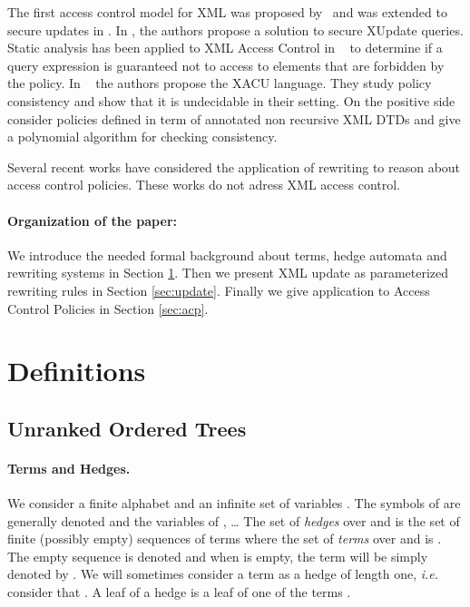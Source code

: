 \documentclass[a4paper]{article}
\newcommand{\remarque}[1]{}
\theoremstyle{plain}
\begin{document}
The first access control model for XML was proposed by~\cite{DamianiVPS00} 
and was extended to secure updates in \cite{Lim03}. In \cite{Gabillon05}, the authors propose a solution to secure XUpdate queries.
Static analysis has been applied to XML Access Control in ~\cite{Murata06} to determine if a query expression 
is guaranteed not to access to elements that are forbidden by the policy. 
In ~\cite{FundulakiManeth07} the authors propose the XACU language. 
They study  policy consistency and show that it is undecidable in their setting. 
On the positive side~\cite{Bravo08} consider policies defined in term of annotated non recursive XML DTDs 
and give a polynomial algorithm for checking consistency. 
\remarque{c'est sur?}

Several recent works have considered the 
application of rewriting to reason about  
access control policies. These works do not adress  XML access control. 


\paragraph{Organization of the paper:} We introduce the needed 
formal background about terms, hedge automata and rewriting systems 
in Section \ref{sec:def}. Then we present XML update as parameterized  rewriting 
rules in Section \ref{sec:update}. Finally we give application to Access Control 
Policies in Section \ref{sec:acp}.

\section{Definitions}
\label{sec:def}

\subsection{Unranked Ordered Trees}

\paragraph{Terms and Hedges.}
We consider a finite alphabet  and an infinite set of variables .
The symbols of  are generally denoted  and the variables of
 , \ldots
The set  of \emph{hedges} over  and  
is the set of finite (possibly empty) sequences of terms
where the set of \emph{terms} over  and  is 
.
The empty sequence is denoted  and 
when  is empty, the term  will be simply denoted by .
We will sometimes consider a term as a hedge of length one, 
\textit{i.e.} consider that .
A leaf of a hedge  is a leaf of one of the terms .
\end{document}
